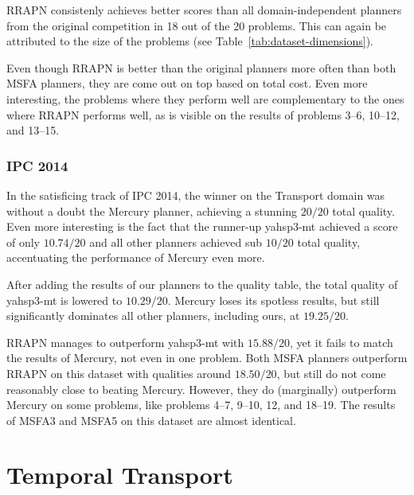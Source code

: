 RRAPN consistenly achieves better scores than all domain-independent planners from the original competition in 18 out of the 20 problems. This can again be attributed to the size
of the problems (see Table~\ref{tab:dataset-dimensions}).

Even though RRAPN is better than the original planners more often than both MSFA planners,
they are come out on top based on total cost. Even more interesting, the problems
where they perform well are complementary to the ones where RRAPN performs well,
as is visible on the results of problems 3--6, 10--12, and 13--15.

\subsubsection{IPC 2014}

In the satisficing track of IPC 2014, the winner on the Transport domain
was without a doubt the Mercury planner, achieving
a stunning $20/20$ total quality. Even more interesting is the fact that
the runner-up yahsp3-mt achieved a score of only $10.74/20$
and all other planners achieved sub $10/20$ total quality,
accentuating the performance of Mercury even more.

After adding the results of our planners to the quality table,
the total quality of yahsp3-mt is lowered to $10.29/20$.
Mercury loses its spotless results, but still significantly dominates all
other planners, including ours, at $19.25/20$.

RRAPN manages to outperform yahsp3-mt with $15.88/20$, yet it fails
to match the results of Mercury, not even in one problem.
Both MSFA planners outperform RRAPN on this dataset with qualities around $18.50/20$,
but still do not come reasonably close to beating Mercury.
However, they do (marginally) outperform Mercury on some problems, like
problems 4--7, 9--10, 12, and 18--19.
The results of MSFA3 and MSFA5 on this dataset are almost identical.


















\section{Temporal Transport}


